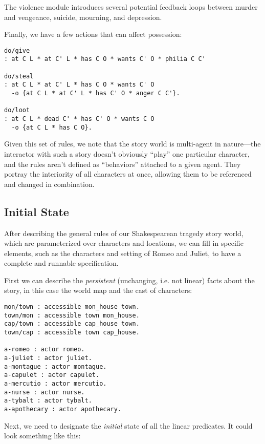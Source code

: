 \documentclass[letterpaper]{article}
\begin{document}
The violence module introduces several potential feedback loops between
murder and vengeance, suicide, mourning, and depression.

Finally, we have a few actions that can affect possession:
\begin{verbatim}
do/give
: at C L * at C' L * has C O * wants C' O * philia C C'

do/steal
: at C L * at C' L * has C O * wants C' O
  -o {at C L * at C' L * has C' O * anger C C'}.

do/loot
: at C L * dead C' * has C' O * wants C O
  -o {at C L * has C O}.
\end{verbatim}

Given this set of rules, we note that the story world is multi-agent in
nature---the interactor with such a story doesn't obviously ``play'' one
particular character, and the rules aren't defined as ``behaviors''
attached to a given agent. They portray the interiority of all characters
at once, allowing them to be referenced and changed in combination.

\subsection{Initial State}

After describing the general rules of our Shakespearean tragedy
story world, which are parameterized over characters and locations, we can
fill in specific elements, such as the characters and setting of Romeo and
Juliet, to have a complete and runnable specification.

First we can describe the {\em persistent} (unchanging, i.e. not linear)
facts about the story, in this case the world map and the cast of
characters:

\begin{verbatim}
mon/town : accessible mon_house town.
town/mon : accessible town mon_house.
cap/town : accessible cap_house town.
town/cap : accessible town cap_house.

a-romeo : actor romeo.
a-juliet : actor juliet.
a-montague : actor montague.
a-capulet : actor capulet.
a-mercutio : actor mercutio.
a-nurse : actor nurse.
a-tybalt : actor tybalt.
a-apothecary : actor apothecary.
\end{verbatim}

Next, we need to designate the {\em initial} state of all the linear
predicates. It could look something like this:
\end{document}

